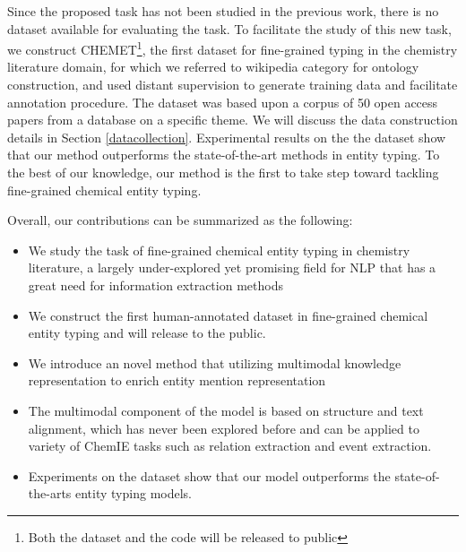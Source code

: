 Since the proposed task has not been studied in the previous work, there is no dataset available for evaluating the task. To facilitate the study of this new task, we construct CHEMET\footnote{Both the dataset and the code will be released to public}, the first dataset for fine-grained typing in the chemistry literature domain, for which we referred to wikipedia category for ontology construction, and used distant supervision to generate training data and facilitate annotation procedure. The dataset was based upon a corpus of 50 open access papers from a database on a specific theme. We will discuss the data construction details in Section \ref{datacollection}. Experimental results on the the dataset show that our method outperforms the state-of-the-art methods in entity typing. To the best of our knowledge, our method is the first to take step toward tackling fine-grained chemical entity typing.



Overall, our contributions can be summarized as the following:



\begin{itemize}
    \item We study the task of fine-grained chemical entity typing in chemistry literature, a largely under-explored yet promising field for NLP that has a great need for information extraction methods
    \item We construct the first human-annotated dataset in  fine-grained chemical entity typing and will release to the public.
    \item We introduce an novel method that utilizing multimodal knowledge representation to enrich entity mention representation
    \item The multimodal component of the model is based on structure and text alignment, which has never been explored before and can be applied to variety of ChemIE tasks such as relation extraction and event extraction.
    \item Experiments on the dataset show that our model outperforms the state-of-the-arts entity typing models. 
\end{itemize}




